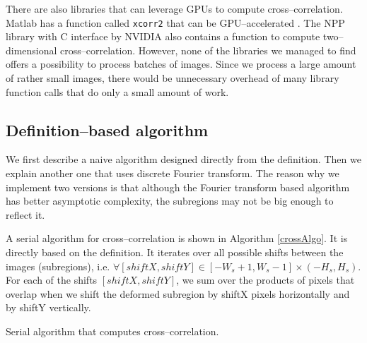 There are also libraries that can leverage GPUs to compute cross--cor\-re\-la\-tion. Matlab has a function called \texttt{xcorr2} that can be GPU--accelerated \cite{MATLAB:2018}. The NPP library with C interface by NVIDIA \cite{NPP} also contains a function to compute two--dimensional cross--correlation. However, none of the libraries we managed to find offers a possibility to process batches of images. Since we process a large amount of rather small images, there would be unnecessary overhead of many library function calls that do only a small amount of work.

\subsection{Definition--based algorithm}
We first describe a naive algorithm designed directly from the definition. Then we explain another one that uses discrete Fourier transform. The reason why we implement two versions is that although the Fourier transform based algorithm has better asymptotic complexity, the subregions may not be big enough to reflect it.

A serial algorithm for cross--correlation is shown in Algorithm \ref{crossAlgo}. It is directly based on the definition. It iterates over all possible shifts between the images (subregions), i.e. $\forall [shiftX, shiftY] \in [-W_s+1, W_s-1] \times (-H_s, H_s)$. For each of the shifts $[shiftX, shiftY]$, we sum over the products of pixels that overlap when we shift the deformed subregion by shiftX pixels horizontally and by shiftY vertically.


\begin{algorithm}
	\caption{Serial algorithm that computes cross--correlation.}
	\label{crossAlgo}
	\vspace{5px}
	
\end{algorithm}

